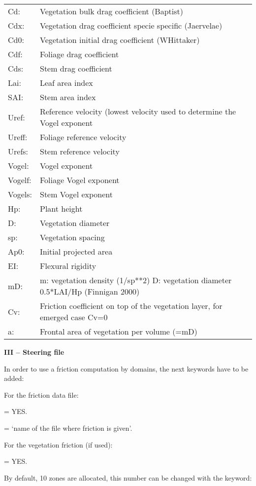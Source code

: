 \begin{tabular}{p{0.5in}p{5.0in}} 
Cd: & Vegetation bulk drag coefficient (Baptist)\\
Cdx: & Vegetation drag coefficient specie specific (Jaervelae)\\
Cd0: & Vegetation initial drag coefficient (WHittaker)\\
Cdf: & Foliage drag coefficient \\
Cds: & Stem drag coefficient \\
Lai: & Leaf area index \\
SAI: & Stem area index \\
Uref: & Reference velocity (lowest velocity used to determine the Vogel exponent \\
Ureff: & Foliage reference velocity \\
Urefs: & Stem reference velocity \\
Vogel: & Vogel exponent \\
Vogelf: & Foliage Vogel exponent \\
Vogels: & Stem Vogel exponent \\
Hp: & Plant height \\
D: & Vegetation diameter \\
sp: & Vegetation spacing \\
Ap0: & Initial projected area \\
EI: & Flexural rigidity \\
mD: & m: vegetation density (1/sp**2) D: vegetation diameter 0.5*LAI/Hp (Finnigan 2000) \\
Cv: & Friction coefficient on top of the vegetation layer, for emerged case Cv=0\\
a: & Frontal area of vegetation per volume (=mD) \\
\end{tabular}




\textbf{III -- Steering file}

In order to use a friction computation by domains, the next keywords have to be
added:

For the friction data file:

 = YES.

 = `name of the file where friction is given'.

For the vegetation friction (if used):

 = YES.

By default, 10 zones are allocated, this number can be changed with the keyword:

